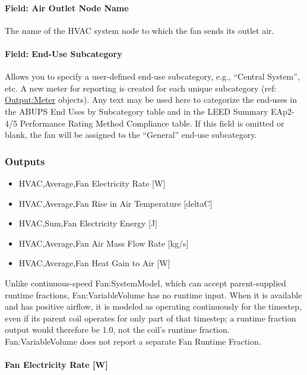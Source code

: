 \paragraph{Field: Air Outlet Node Name}\label{field-air-outlet-node-name-2-000}

The name of the HVAC system node to which the fan sends its outlet air.

\paragraph{Field: End-Use Subcategory}

Allows you to specify a user-defined end-use subcategory, e.g., ``Central System'', etc. A new meter for reporting is created for each unique subcategory (ref: \hyperref[outputmeter-and-outputmetermeterfileonly]{Output:Meter} objects). Any text may be used here to categorize the end-uses in the ABUPS End Uses by Subcategory table and in the LEED Summary EAp2-4/5 Performance Rating Method Compliance table. If this field is omitted or blank, the fan will be assigned to the ``General'' end-use subcategory.

\subsubsection{Outputs}\label{outputs-2-009}

\begin{itemize}
\item
  HVAC,Average,Fan Electricity Rate {[}W{]}
\item
  HVAC,Average,Fan Rise in Air Temperature {[}deltaC{]}
\item
  HVAC,Sum,Fan Electricity Energy {[}J{]}
\item
  HVAC,Average,Fan Air Mass Flow Rate {[}kg/s{]}
\item
  HVAC,Average,Fan Heat Gain to Air {[}W{]}
\end{itemize}

Unlike continuous-speed Fan:SystemModel, which can accept parent-supplied runtime fractions, Fan:VariableVolume has no runtime input. When it is available and has positive airflow, it is modeled as operating continuously for the timestep, even if its parent coil operates for only part of that timestep; a runtime fraction output would therefore be 1.0, not the coil's runtime fraction. Fan:VariableVolume does not report a separate Fan Runtime Fraction.

\paragraph{Fan Electricity Rate {[}W{]}}\label{fan-electric-power-w-2}

